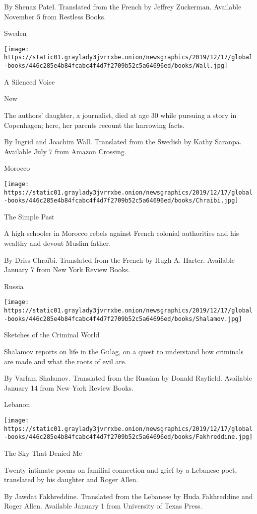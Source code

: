  By Shenaz Patel. Translated from the French by Jeffrey Zuckerman.
Available November 5 from Restless Books.

Sweden

\texttt{[image: https://static01.graylady3jvrrxbe.onion/newsgraphics/2019/12/17/global-books/446c285e4b84fcabc4f4d7f2709b52c5a64696ed/books/Wall.jpg]}

A Silenced Voice

New

The authors' daughter, a journalist, died at age 30 while pursuing a
story in Copenhagen; here, her parents recount the harrowing facts.

 By Ingrid and Joachim Wall. Translated from the Swedish by Kathy
Saranpa. Available July 7 from Amazon Crossing.

Morocco

\texttt{[image: https://static01.graylady3jvrrxbe.onion/newsgraphics/2019/12/17/global-books/446c285e4b84fcabc4f4d7f2709b52c5a64696ed/books/Chraibi.jpg]}

The Simple Past

A high schooler in Morocco rebels against French colonial authorities
and his wealthy and devout Muslim father.

 By Driss Chraïbi. Translated from the French by Hugh A. Harter.
Available January 7 from New York Review Books.

Russia

\texttt{[image: https://static01.graylady3jvrrxbe.onion/newsgraphics/2019/12/17/global-books/446c285e4b84fcabc4f4d7f2709b52c5a64696ed/books/Shalamov.jpg]}

Sketches of the Criminal World

Shalamov reports on life in the Gulag, on a quest to understand how
criminals are made and what the roots of evil are.

 By Varlam Shalamov. Translated from the Russian by Donald Rayfield.
Available January 14 from New York Review Books.

Lebanon

\texttt{[image: https://static01.graylady3jvrrxbe.onion/newsgraphics/2019/12/17/global-books/446c285e4b84fcabc4f4d7f2709b52c5a64696ed/books/Fakhreddine.jpg]}

The Sky That Denied Me

Twenty intimate poems on familial connection and grief by a Lebanese
poet, translated by his daughter and Roger Allen.

 By Jawdat Fakhreddine. Translated from the Lebanese by Huda Fakhreddine
and Roger Allen. Available January 1 from University of Texas Press.

